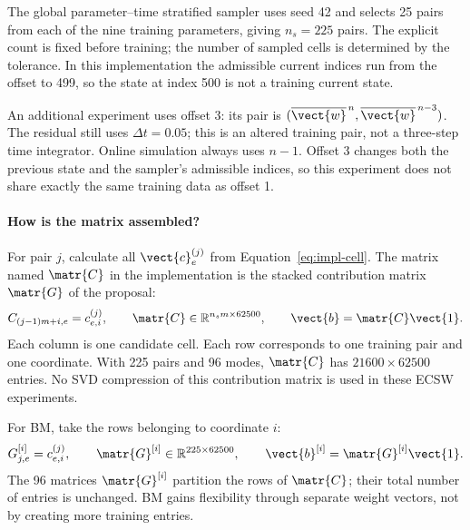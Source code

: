 The global parameter--time stratified sampler uses seed 42 and selects 25 pairs from each of the nine training parameters, giving $n_s=225$ pairs. The explicit count is fixed before training; the number of sampled cells is determined by the tolerance. In this implementation the admissible current indices run from the offset to 499, so the state at index 500 is not a training current state.

An additional experiment uses offset 3: its pair is $(\overline{\vect{w}}^{\,n},\overline{\vect{w}}^{\,n-3})$. The residual still uses $\Delta t=0.05$; this is an altered training pair, not a three-step time integrator. Online simulation always uses $n-1$. Offset 3 changes both the previous state and the sampler's admissible indices, so this experiment does not share exactly the same training data as offset 1.

\paragraph{How is the matrix assembled?}
For pair $j$, calculate all $\vect{c}_e^{(j)}$ from Equation~\eqref{eq:impl-cell}. The matrix named $\matr{C}$ in the implementation is the stacked contribution matrix $\matr{G}$ of the proposal:
\begin{equation}
 C_{(j-1)m+i,e}=c_{e,i}^{(j)},\qquad
 \matr{C}\in\mathbb R^{n_sm\times62500},\qquad \vect{b}=\matr{C}\vect{1}.
 \label{eq:impl-C}
\end{equation}
Each column is one candidate cell. Each row corresponds to one training pair and one coordinate. With 225 pairs and 96 modes, $\matr{C}$ has $21600\times62500$ entries. No SVD compression of this contribution matrix is used in these ECSW experiments.

For BM, take the rows belonging to coordinate $i$:
\begin{equation}
 G^{[i]}_{j,e}=c_{e,i}^{(j)},\qquad
 \matr{G}^{[i]}\in\mathbb R^{225\times62500},\qquad
 \vect{b}^{[i]}=\matr{G}^{[i]}\vect{1}.
 \label{eq:impl-Gi}
\end{equation}
The 96 matrices $\matr{G}^{[i]}$ partition the rows of $\matr{C}$; their total number of entries is unchanged. BM gains flexibility through separate weight vectors, not by creating more training entries.

